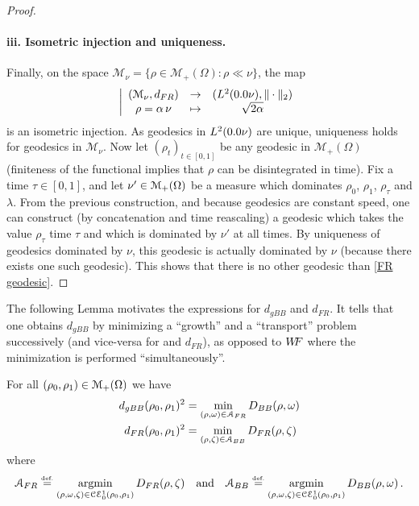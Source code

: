 \begin{proof}
\paragraph{iii. Isometric injection and uniqueness.} Finally, on the space $\mathcal{M}_{\nu} = \{ \rho \in \mathcal{M}_+(\Omega) : \rho \ll \nu\}$, the map  
\[
\left|
\begin{array}{ccc}
(\mathcal{M}_{\nu}, d_{FR}) & \rightarrow & (L^2(\d \nu), \Vert \cdot \Vert_2) \\
\rho = \alpha\, \nu & \mapsto & \sqrt{2\alpha}
\end{array}
\right.
\]
is an isometric injection. As geodesics in $L^2(\d \nu)$ are unique, uniqueness holds for geodesics in $\mathcal{M}_{\nu}$. %
%
Now let $(\rho_t)_{t\in [0,1]}$ be any geodesic in $\mathcal{M}_+(\Omega)$ (finiteness of the functional implies that $\rho$ can be disintegrated in time). Fix a time $\tau\in [0,1]$, and let $\nu'\in \mathcal{M}_+(\Omega)$ be a measure which dominates $\rho_0$, $\rho_1$, $\rho_\tau$ and $\lambda$. From the previous construction, and because geodesics are constant speed, one can construct (by concatenation and time reascaling) a geodesic which takes the value $\rho_\tau$ time $\tau$ and which is dominated by $\nu'$ at all times. By uniqueness of geodesics dominated by $\nu$, this geodesic is actually dominated by $\nu$ (because there exists one such geodesic). This shows that there is no other geodesic than \eqref{FR geodesic}.
\end{proof}
The following Lemma motivates the expressions for $d_{gBB}$ and $d_{FR}$. It tells that one obtains $d_{gBB}$  by minimizing  a ``growth'' and a ``transport'' problem successively (and vice-versa for and $d_{FR}$), as opposed to $W\! \! F$ where the minimization is performed ``simultaneously''.

\begin{lemma}
For all $(\rho_0,\rho_1)\in \mathcal{M}_+(\Omega)$ we have
\begin{align*}
d_{gBB}(\rho_0,\rho_1)^2 &=  \min_{(\rho,\omega)\in \mathcal{A}_{FR}}  D_{BB}(\rho,\omega) \\
d_{FR}  (\rho_0,\rho_1)^2 &=  \min_{(\rho,\zeta)\in \mathcal{A}_{BB}}  D_{FR}(\rho,\zeta) 
\end{align*}
where 
\begin{equation}
\label{argmin sets}
\mathcal{A}_{FR} \defeq \argmin_{(\rho,\M,\Z) \in \ccons} D_{FR} (\rho,\Z)
\quad \text{and} \quad
\mathcal{A}_{BB} \defeq \argmin_{(\rho,\M,\Z) \in \ccons} D_{BB} (\rho,\M)\,.
\end{equation}
\end{lemma}

